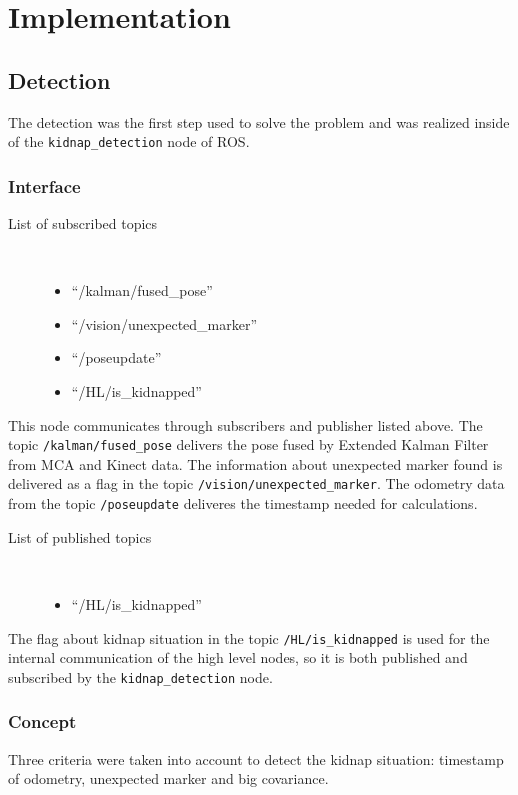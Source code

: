 \section{Implementation} \label{implementation}
\subsection{Detection}
The detection was the first step used to solve the problem and was realized inside of the \texttt{kidnap\_detection} node of ROS. 

\subsubsection{Interface}
\begin{description}
\item[List of subscribed topics]\
	\begin{itemize}
	\item ``/kalman/fused\_pose'' 
	\item ``/vision/unexpected\_marker'' 
	\item ``/poseupdate'' 
	\item ``/HL/is\_kidnapped''
	\end{itemize}
\end{description}

This node communicates through subscribers and publisher listed above. The topic \texttt{/kalman/fused\_pose} delivers the pose fused by Extended Kalman Filter from MCA and Kinect data. The information about unexpected marker found is delivered as a flag in the topic \texttt{/vision/unexpected\_marker}. The odometry data from the topic \texttt{/poseupdate} deliveres the timestamp needed for calculations. 

\begin{description}
\item[List of published topics]\
	\begin{itemize}
	\item ``/HL/is\_kidnapped''
	\end{itemize}
\end{description}

The flag about kidnap situation in the topic \texttt{/HL/is\_kidnapped} is used for the internal communication of the high level nodes, so it is both published and subscribed by the \texttt{kidnap\_detection} node.

\subsubsection{Concept}
Three criteria were taken into account to detect the kidnap situation: timestamp of odometry, unexpected marker and big covariance.

